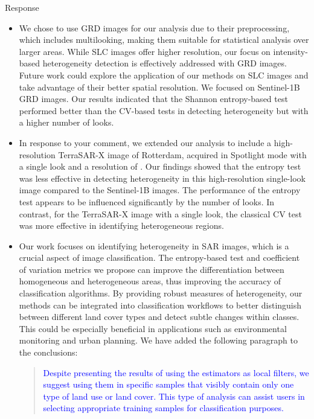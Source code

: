 \documentclass[11pt]{report}
\begin{document}
\begin{responsebox}{Response}
\begin{itemize}
 \item We chose to use GRD images for our analysis due to their preprocessing, which includes multilooking, making them suitable for statistical analysis over larger areas. While SLC images offer higher resolution, our focus on intensity-based heterogeneity detection is effectively addressed with GRD images. 
Future work could explore the application of our methods on SLC images and take advantage of their better spatial resolution.
We focused on Sentinel-1B GRD images. Our results indicated that the Shannon entropy-based test performed better than the CV-based tests in detecting heterogeneity but with a higher number of looks.

\item In response to your comment, we extended our analysis to include a high-resolution TerraSAR-X image of Rotterdam, acquired in Spotlight mode with a single look and a resolution of .
Our findings showed that the entropy test was less effective in detecting heterogeneity in this high-resolution single-look image compared to the Sentinel-1B images. 
The performance of the entropy test appears to be influenced significantly by the number of looks.
In contrast, for the TerraSAR-X image with a single look, the classical CV test was more effective in identifying heterogeneous regions.

\item Our work focuses on identifying heterogeneity in SAR images, which is a crucial aspect of image classification. 
The entropy-based test and coefficient of variation metrics we propose can improve the differentiation between homogeneous and heterogeneous areas, thus improving the accuracy of classification algorithms. 
By providing robust measures of heterogeneity, our methods can be integrated into classification workflows to better distinguish between different land cover types and detect subtle changes within classes. This could be especially beneficial in applications such as environmental monitoring and urban planning.
We have added the following paragraph to the conclusions:
\begin{quote}
	\textcolor{blue}{Despite presenting the results of using the estimators as local filters, we suggest using them in specific samples that visibly contain only one type of land use or land cover. 
		This type of analysis can assist users in selecting appropriate training samples for classification purposes.}
\end{quote}
\end{itemize}
\end{responsebox}
\end{document}
